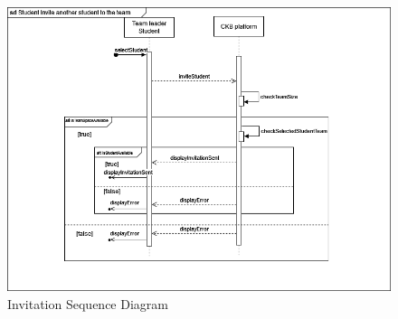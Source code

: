 \begin{center}
    \begin{figure} [H]
        \begin{center}
            \includegraphics[width=0.9\linewidth]{Images/SequenceDiagrams/SD_5.png}
            \caption{Invitation Sequence Diagram}
            \label{fig: invitation_seq_diag}
        \end{center}
    \end{figure}
\end{center}

